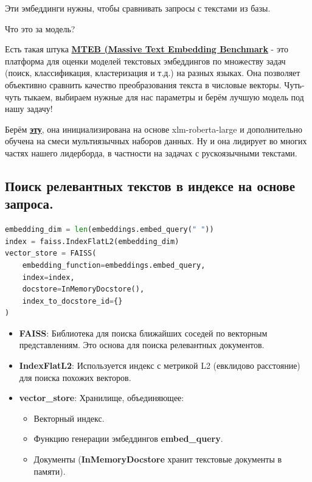 \documentclass{article}
\begin{document}
Эти эмбеддинги нужны, чтобы сравнивать запросы с текстами из базы.

Что это за модель?

Есть такая штука \textbf{\href{https://huggingface.co/spaces/mteb/leaderboard}{MTEB (Massive Text Embedding Benchmark}} - это платформа для оценки моделей текстовых эмбеддингов по множеству задач (поиск, классификация, кластеризация и т.д.) на разных языках. Она позволяет объективно сравнить качество преобразования текста в числовые векторы. Чуть-чуть тыкаем, выбираем нужные для нас параметры и берём лучшую модель под нашу задачу!

Берём \textbf{\href{https://huggingface.co/intfloat/multilingual-e5-large-instruct}{эту}}, она инициализирована на основе xlm-roberta-large и дополнительно обучена на смеси мультиязычных наборов данных. Ну и она лидирует во многих частях нашего лидерборда, в частности на задачах с рускоязычными текстами.


\subsection{Поиск релевантных текстов в индексе на основе запроса.}

\begin{lstlisting}[language=Python, label=code:example]
embedding_dim = len(embeddings.embed_query(" "))  
index = faiss.IndexFlatL2(embedding_dim)
vector_store = FAISS(
    embedding_function=embeddings.embed_query,  
    index=index,
    docstore=InMemoryDocstore(),
    index_to_docstore_id={}
)
\end{lstlisting}

\begin{itemize}
    \item \textbf{FAISS}: Библиотека для поиска ближайших соседей по векторным представлениям. Это основа для поиска релевантных документов.
    \item \textbf{IndexFlatL2}: Используется индекс с метрикой L2 (евклидово расстояние) для поиска похожих векторов.
    \item \textbf{vector\_store}: Хранилище, объединяющее:
    \begin{itemize}
        \item Векторный индекс.
        \item Функцию генерации эмбеддингов \textbf{embed\_query}.
        \item Документы (\textbf{InMemoryDocstore} хранит текстовые документы в памяти).
    \end{itemize}
\end{itemize}
\end{document}
